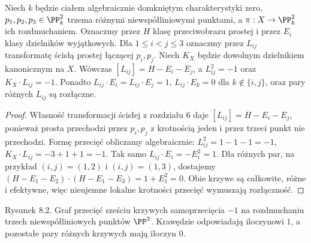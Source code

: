\begin{stwierdzenie}
\label{st:ga8-hexagon}
Niech $k$ będzie ciałem algebraicznie domkniętym
charakterystyki zero, $p_1,p_2,p_3\in\PP^2_k$ trzema
różnymi niewspółliniowymi punktami, a
$\pi:X\to\PP^2_k$ ich rozdmuchaniem. Oznaczmy przez
$H$ klasę przeciwobrazu prostej i przez $E_i$ klasy
dzielników wyjątkowych. Dla $1\le i<j\le3$ oznaczmy
przez $L_{ij}$ transformatę ścisłą prostej łączącej
$p_i,p_j$. Niech $K_X$ będzie dowolnym dzielnikiem
kanonicznym na $X$.
Wówczas $[L_{ij}]=H-E_i-E_j$, a
$L_{ij}^2=-1$ oraz $K_X\cdot L_{ij}=-1$.
Ponadto $L_{ij}\cdot E_i=L_{ij}\cdot E_j=1$,
$L_{ij}\cdot E_k=0$ dla $k\notin\{i,j\}$,
oraz pary różnych $L_{ij}$ są rozłączne.
\end{stwierdzenie}
\begin{proof}
Własność transformacji ścisłej z rozdziału 6 daje
$[L_{ij}]=H-E_i-E_j$, ponieważ prosta przechodzi
przez $p_i,p_j$ z krotnością jeden i przez trzeci punkt
nie przechodzi. Formę przecięć obliczamy algebraicznie:
$L_{ij}^2=1-1-1=-1$,
$K_X\cdot L_{ij}=-3+1+1=-1$.
Tak samo $L_{ij}\cdot E_i= -E_i^2=1$.
Dla różnych par, na przykład $(i,j)=(1,2)$ i
$(i,j)=(1,3)$, dostajemy
$(H-E_1-E_2)\cdot(H-E_1-E_3)=1+E_1^2=0$.
Obie krzywe są całkowite, różne i efektywne, więc
nieujemne lokalne krotności przecięć wymuszają
rozłączność.
\end{proof}

\begin{center}

{\small Rysunek 8.2. Graf przecięć sześciu krzywych
samoprzecięcia $-1$ na rozdmuchaniu trzech niewspółliniowych
punktów $\PP^2$. Krawędzie odpowiadają iloczynowi $1$,
a pozostałe pary różnych krzywych mają iloczyn $0$.}\par
\end{center}

